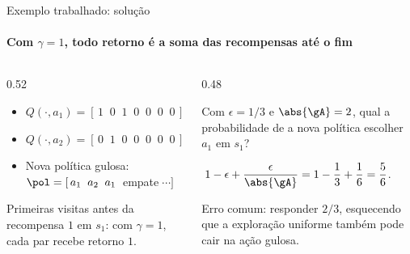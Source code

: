 \documentclass[aspectratio=169, 11pt]{beamer}
\begin{document}
\begin{frame}{Exemplo trabalhado: solução}
  \framesubtitle{Com $\gamma = 1$, todo retorno é a soma das recompensas até o fim}

  \begin{columns}[T]
    \begin{column}{0.52\textwidth}
      \begin{respbox}
        \begin{itemize}\setlength{\itemsep}{0.25ex}
          \item $Q(\cdot, a_1) = [\,1\;\;0\;\;1\;\;0\;\;0\;\;0\;\;0\,]$
          \item $Q(\cdot, a_2) = [\,0\;\;1\;\;0\;\;0\;\;0\;\;0\;\;0\,]$
          \item Nova política gulosa: $\pol = [\,a_1\;\;a_2\;\;a_1\;\;$empate$\;\cdots]$
        \end{itemize}
      \end{respbox}

      \smallskip
      {\footnotesize Primeiras visitas antes da recompensa $1$ em $s_1$: com
      $\gamma=1$, cada par recebe retorno $1$.}
    \end{column}
    \begin{column}{0.48\textwidth}

      \begin{quizbox}{}
        Com $\epsilon = 1/3$ e $\abs{\gA} = 2$, qual a probabilidade de a
        nova política escolher $a_1$ em $s_1$?
      \end{quizbox}

      \pause
      \begin{respbox}
        $\;1 - \epsilon + \dfrac{\epsilon}{\abs{\gA}}
          = 1 - \dfrac{1}{3} + \dfrac{1}{6} = \dfrac{5}{6}$.

        \smallskip
        {\footnotesize Erro comum: responder $2/3$, esquecendo que a
        exploração uniforme também pode cair na ação gulosa.}
      \end{respbox}
    \end{column}
  \end{columns}
\end{frame}
\end{document}
